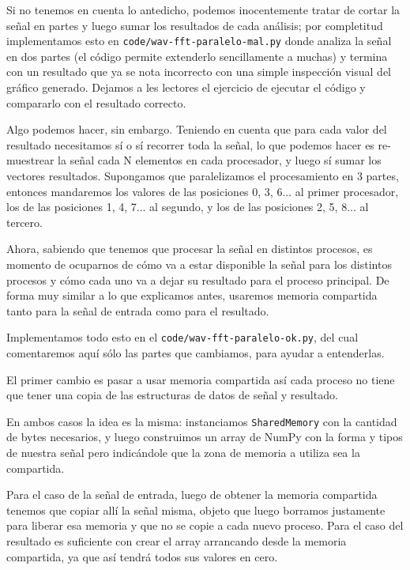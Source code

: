 Si no tenemos en cuenta lo antedicho, podemos inocentemente tratar de cortar la señal en partes y luego sumar los resultados de cada análisis; por completitud implementamos esto en \texttt{code/wav-fft-paralelo-mal.py} donde analiza la señal en dos partes (el código permite extenderlo sencillamente a muchas) y termina con un resultado que ya se nota incorrecto con una simple inspección visual del gráfico generado. Dejamos a les lectores el ejercicio de ejecutar el código y compararlo con el resultado correcto.

Algo podemos hacer, sin embargo. Teniendo en cuenta que para cada valor del resultado necesitamos sí o sí recorrer toda la señal, lo que podemos hacer es re-muestrear la señal cada N elementos en cada procesador, y luego sí sumar los vectores resultados. Supongamos que paralelizamos el procesamiento en 3 partes, entonces mandaremos los valores de las posiciones 0, 3, 6... al primer procesador, los de las posiciones 1, 4, 7... al segundo, y los de las posiciones 2, 5, 8... al tercero.

Ahora, sabiendo que tenemos que procesar la señal en distintos procesos, es momento de ocuparnos de cómo va a estar disponible la señal para los distintos procesos y cómo cada uno va a dejar su resultado para el proceso principal. De forma muy similar a lo que explicamos antes, usaremos memoria compartida tanto para la señal de entrada como para el resultado.

Implementamos todo esto en el \texttt{code/wav-fft-paralelo-ok.py}, del cual comentaremos aquí sólo las partes que cambiamos, para ayudar a entenderlas.


El primer cambio es pasar a usar memoria compartida así cada proceso no tiene que tener una copia de las estructuras de datos de señal y resultado.

En ambos casos la idea es la misma: instanciamos \texttt{SharedMemory} con la cantidad de bytes necesarios, y luego construimos un array de NumPy con la forma y tipos de nuestra señal pero indicándole que la zona de memoria a utiliza sea la compartida.

Para el caso de la señal de entrada, luego de obtener la memoria compartida tenemos que copiar allí la señal misma, objeto que luego borramos justamente para liberar esa memoria y que no se copie a cada nuevo proceso. Para el caso del resultado es suficiente con crear el array arrancando desde la memoria compartida, ya que así tendrá todos sus valores en cero.

